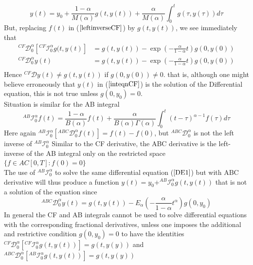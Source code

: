 \documentclass[twoside]{book}
\begin{document}
{\begin{equation}
    \label{inteqnCF}
    y(t) = y_0 + \frac{1-\alpha}{M(\alpha)} g(t,y(t)) + \frac{\alpha}{M(\alpha)} \int_0^t g(\tau,y(\tau)) d\tau
\end{equation}
But, replacing $f(t)$ in ($\ref{leftinverseCF}$) by $g(t,y(t))$, we see immediately that
\begin{align*}
    ^{CF}\mathcal{D}^{\alpha}_{0} [^{CF}\mathscr{I}^{\alpha}_{0} g(t,y(t)] & = g(t,y(t)) - \exp(-\frac{\alpha}{1-\alpha}t)g(0,y(0)) \\
    ^{CF}\mathcal{D}^{\alpha}_{0} y(t)                                     & = g(t,y(t)) - \exp(-\frac{\alpha}{1-\alpha}t)g(0,y(0)) \\
\end{align*}
Hence $^{CF}\mathcal{D}y(t) \neq g(t,y(t))$ if $g(0,y(0)) \neq 0$. that is, although one might believe erroneously that $y(t)$ in ($\ref{inteqnCF}$) is the solution of the Differential equation, this is not true unless $g(0,y_0)=0$.\\
Situation is similar for the AB integral
\begin{equation}
    ^{AB}\mathscr{I}^{\alpha}_{0} f(t) = \frac{1-\alpha}{B(\alpha)}f(t) + \frac{\alpha}{B(\alpha)\Gamma{(\alpha)}} \int_0^t (t-\tau)^{\alpha-1} f(\tau) d\tau
\end{equation}
Here again $^{AB}\mathscr{I}^{\alpha}_{0}[^{ABC}\mathcal{D}^{\alpha}_{0} f(t)] = f(t) - f(0)$, but $^{ABC}\mathcal{D}^{\alpha}_{0}$ is not the left inverse of $^{AB}\mathscr{I}^{\alpha}_{0}$
Similar to the CF derivative, the ABC derivative is the left-inverse of the AB integral only on the restricted space $\{f \in AC[0,T] : f(0)=0\}$\\
The use of $^{AB} \mathscr{I}^{\alpha}_{0}$ to solve the same differential equation ($\ref{DE1}$) but with ABC derivative will thus produce a function $y(t) = y_0 + ^{AB}\mathscr{I}^{\alpha}_{0}g(t,y(t))$ that is not a solution of the equation since
$$^{ABC}\mathcal{D}^{\alpha}_{0} y(t) = g(t,y(t)) - E_{\alpha}(-\frac{\alpha}{1-\alpha}t^{\alpha})g(0,y_0)$$
\newline
In general the CF and AB integrals cannot be used to solve differential equations with the corresponding fractional derivatives, unless one imposes the additional and restrictive condition $g(0,y_0)=0$ to have the identities $^{CF}\mathcal{D}^{\alpha}_{0} [^{CF} \mathscr{I}^{\alpha}_{0} g(t,y(t))] = g(t,y(y)) $ and $^{ABC}\mathcal{D}^{\alpha}_{0} [^{AB} \mathscr{I}^{\alpha}_{0} g(t,y(t))] = g(t,y(y)) $\\
}
\end{document}
